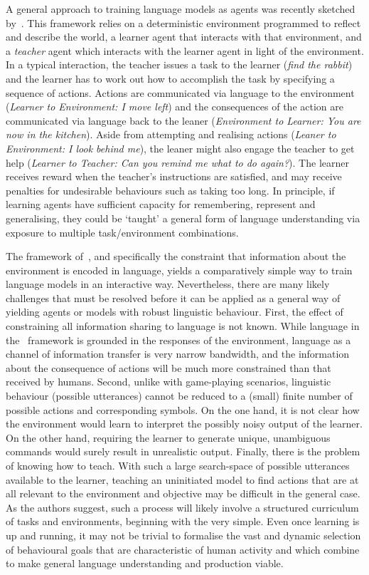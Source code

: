 A general approach to training language models as agents was recently sketched by~\cite{mikolov2015roadmap}. This framework relies on a deterministic environment programmed to reflect and describe the world, a learner agent that interacts with that environment, and a \emph{teacher} agent which interacts with the learner agent in light of the environment. In a typical interaction, the teacher issues a task to the learner (\emph{find the rabbit}) and the learner has to work out how to accomplish the task by specifying a sequence of actions. Actions are communicated via language to the environment (\emph{Learner to Environment: I move left}) and the consequences of the action are communicated via language back to the leaner (\emph{Environment to Learner: You are now in the kitchen}). Aside from attempting and realising actions (\emph{Leaner to Environment: I look behind me}), the leaner might also engage the teacher to get help (\emph{Learner to Teacher: Can you remind me what to do again?}). The learner receives reward when the teacher's instructions are satisfied, and may receive penalties for undesirable behaviours such as taking too long. In principle, if learning agents have sufficient capacity for remembering, represent and generalising, they could be `taught' a general form of language understanding via exposure to multiple task/environment combinations. 

The framework of~\cite{mikolov2015roadmap}, and specifically the constraint that information about the environment is encoded in language, yields a comparatively simple way to train language models in an interactive way. Nevertheless, there are many likely challenges that must be resolved before it can be applied as a general way of yielding agents or models with robust linguistic behaviour. First, the effect of constraining all information sharing to language is not known. While language in the~\cite{mikolov2015roadmap} framework is grounded in the responses of the environment, language as a channel of information transfer is very narrow bandwidth, and the information about the consequence of actions will be much more constrained than that received by humans. Second, unlike with game-playing scenarios, linguistic behaviour (possible utterances) cannot be reduced to a (small) finite number of possible actions and corresponding symbols. On the one hand, it is not clear how the environment would learn to interpret the possibly noisy output of the learner. On the other hand, requiring the learner to generate unique, unambiguous commands would surely result in unrealistic output. Finally, there is the problem of knowing how to teach. With such a large search-space of possible utterances available to the learner, teaching an uninitiated model to find actions that are at all relevant to the environment and objective may be difficult in the general case. As the authors suggest, such a process will likely involve a structured curriculum of tasks and environments, beginning with the very simple. Even once learning is up and running, it may not be trivial to formalise the vast and dynamic selection of behavioural goals that are characteristic of human activity and which combine to make general language understanding and production viable. 


